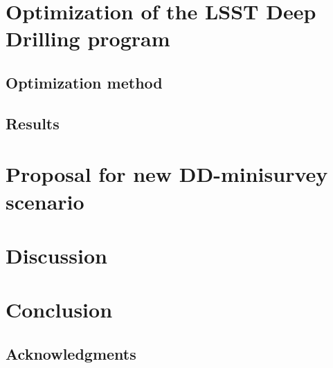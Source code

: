 \documentclass[\docopts]{\docclass}
\begin{document}
\section{Optimization of the LSST Deep Drilling  program}
\label{sec:optimization}
\subsection{Optimization method}


\subsection{Results}



\section{Proposal for new DD-minisurvey scenario}
\label{sec:proposal}


\section{Discussion}
\label{sec:discussion}




\section{Conclusion}
\label{sec:conclusion}




\subsection*{Acknowledgments}


\end{document}
